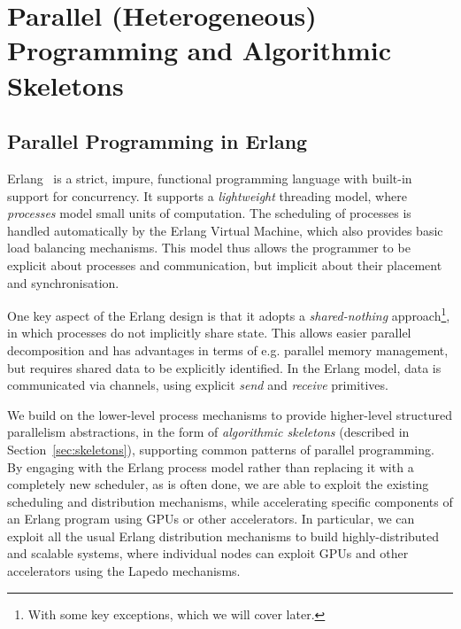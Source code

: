 \documentclass[final]{jfp1}
\newcommand{\lapedo}{\xspace{\sc Lapedo}\xspace}
\newcommand{\Lapedo}{\lapedo}
\begin{document}


\section{Parallel (Heterogeneous) Programming and Algorithmic Skeletons}

\subsection{Parallel Programming in Erlang}

Erlang~\cite{Erlang} is a strict, impure, functional programming language with
built-in support for concurrency. It supports a \emph{lightweight}
threading model, where \emph{processes} model small units of
computation. %
The scheduling of processes is handled
automatically by the Erlang Virtual Machine, which also provides basic
load balancing mechanisms. This model thus allows the programmer to 
be explicit about processes and communication, but implicit about
their placement and synchronisation.

One key aspect of the Erlang design is that it adopts a
\emph{shared-nothing} approach\footnote{With some key exceptions, which
  we will cover later.}, in which processes do not implicitly share
state.  This allows easier parallel decomposition and has advantages in
terms of e.g. parallel memory management, but requires
shared data to be explicitly identified.  In the Erlang model, data is
communicated via channels, using explicit \emph{send} and \emph{receive}
primitives. 

We build on the lower-level process mechanisms to provide higher-level structured 
parallelism abstractions,
in the form of \emph{algorithmic skeletons} (described in Section~\ref{sec:skeletons}), supporting common patterns
of parallel programming.  By engaging with the Erlang process model
rather than replacing it with a completely new scheduler, as is often
done, we are able to exploit the existing scheduling and distribution
mechanisms, while accelerating specific components of an Erlang program
using GPUs or other accelerators.  In particular, we can exploit all the
usual Erlang distribution mechanisms to build highly-distributed and
scalable systems, where individual nodes can exploit GPUs and other
accelerators using the \Lapedo{} mechanisms.
\end{document}
